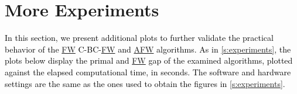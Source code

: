 \documentclass{article}
\newcommand{\gabrev}[1]{\textcolor{black}{#1}}
\newcommand\newlink[2]{\hyperlink{#1}{\normalcolor #2}}
\newcommand{\FW}{\newlink{def:acronym_frank_wolfe}{FW}}
\newcommand{\AFW}{\newlink{def:acronym_away_frank_wolfe}{AFW}}
\begin{document}
%
%
%
%
%
%
%
%
%
%
%
%
%
%
%
%
%
%
%
%
\section{More Experiments}\label{app:extra_experiments}

\gabrev{In this section, we present additional plots to further validate the practical behavior of the \FW{} C-BC-\FW{} and \AFW{} algorithms.
As in \cref{s:experiments}, the plots below display the primal and \FW{} gap of the examined algorithms, plotted against the elapsed computational time, in seconds.
The software and hardware settings are the same as the ones used to obtain the figures in \cref{s:experiments}.}
\end{document}
